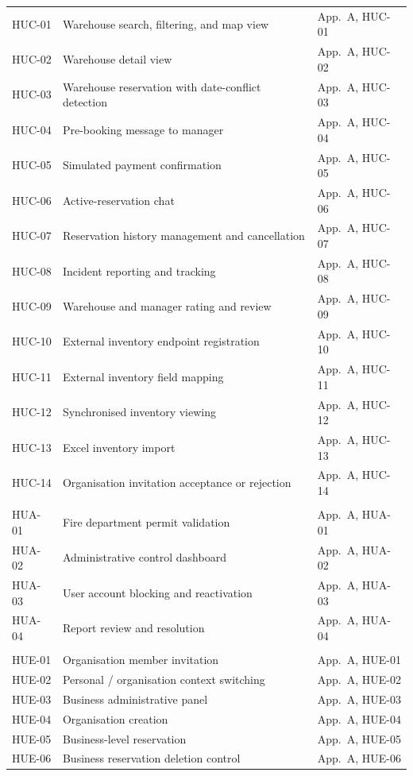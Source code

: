 \documentclass[11pt,a4paper,oneside]{report}
\begin{document}
\begin{longtable}{>{\raggedright\arraybackslash}p{2.0cm} p{9.2cm} >{\raggedright\arraybackslash}p{3.4cm}}
    \multicolumn{3}{l}{\textit{Client (HUC)}} \\
    \midrule
    HUC-01 & Warehouse search, filtering, and map view & App.~A, HUC-01 \\
    HUC-02 & Warehouse detail view & App.~A, HUC-02 \\
    HUC-03 & Warehouse reservation with date-conflict detection & App.~A, HUC-03 \\
    HUC-04 & Pre-booking message to manager & App.~A, HUC-04 \\
    HUC-05 & Simulated payment confirmation & App.~A, HUC-05 \\
    HUC-06 & Active-reservation chat & App.~A, HUC-06 \\
    HUC-07 & Reservation history management and cancellation & App.~A, HUC-07 \\
    HUC-08 & Incident reporting and tracking & App.~A, HUC-08 \\
    HUC-09 & Warehouse and manager rating and review & App.~A, HUC-09 \\
    HUC-10 & External inventory endpoint registration & App.~A, HUC-10 \\
    HUC-11 & External inventory field mapping & App.~A, HUC-11 \\
    HUC-12 & Synchronised inventory viewing & App.~A, HUC-12 \\
    HUC-13 & Excel inventory import & App.~A, HUC-13 \\
    HUC-14 & Organisation invitation acceptance or rejection & App.~A, HUC-14 \\
    \midrule

    \multicolumn{3}{l}{\textit{Administrator (HUA)}} \\
    \midrule
    HUA-01 & Fire department permit validation & App.~A, HUA-01 \\
    HUA-02 & Administrative control dashboard & App.~A, HUA-02 \\
    HUA-03 & User account blocking and reactivation & App.~A, HUA-03 \\
    HUA-04 & Report review and resolution & App.~A, HUA-04 \\
    \midrule

    \multicolumn{3}{l}{\textit{Organisation / Company (HUE)}} \\
    \midrule
    HUE-01 & Organisation member invitation & App.~A, HUE-01 \\
    HUE-02 & Personal / organisation context switching & App.~A, HUE-02 \\
    HUE-03 & Business administrative panel & App.~A, HUE-03 \\
    HUE-04 & Organisation creation & App.~A, HUE-04 \\
    HUE-05 & Business-level reservation & App.~A, HUE-05 \\
    HUE-06 & Business reservation deletion control & App.~A, HUE-06 \\
    \midrule


\end{longtable}
\end{document}
